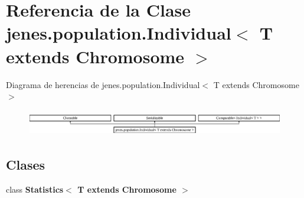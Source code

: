 \hypertarget{classjenes_1_1population_1_1_individual_3_01_t_01extends_01_chromosome_01_4}{\section{Referencia de la Clase jenes.\-population.\-Individual$<$ T extends Chromosome $>$}
\label{classjenes_1_1population_1_1_individual_3_01_t_01extends_01_chromosome_01_4}
}
Diagrama de herencias de jenes.\-population.\-Individual$<$ T extends Chromosome $>$\begin{figure}[H]
\begin{center}
\leavevmode
\includegraphics[height=1.141692cm]{classjenes_1_1population_1_1_individual_3_01_t_01extends_01_chromosome_01_4}
\end{center}
\end{figure}
\subsection*{Clases}
\begin{DoxyCompactItemize}
\item 
class {\bfseries Statistics$<$ T extends Chromosome $>$}
\end{DoxyCompactItemize}
